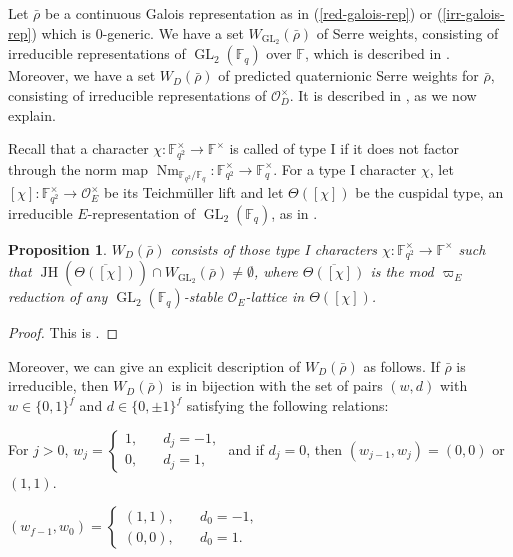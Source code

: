 \documentclass{article}
\newtheorem{proposition}[definition]{Proposition}
\numberwithin{equation}{section}
\DeclareMathOperator{\GL}{GL}
\DeclareMathOperator{\JH}{JH}
\DeclareMathOperator{\Nm}{Nm}
\newcommand{\bF}{\mathbb{F}}
\newcommand{\cO}{\mathcal{O}}
\begin{document}
Let $\bar{\rho}$ be a continuous Galois representation as in (\ref{red-galois-rep}) or (\ref{irr-galois-rep}) which is $0$-generic. 
We have a set $W_{\GL_2}(\bar{\rho})$ of Serre weights, consisting of irreducible representations of $\GL_2(\bF_q)$ over $\bF$, which is described in \cite[\S~11]{BP12}. 
Moreover, we have a set $W_D(\bar{\rho})$ of predicted quaternionic Serre weights for $\bar{\rho}$, consisting of irreducible representations of $\cO_D^\times$. 
It is described in \cite{CW23}, as we now explain. 

Recall that a character $\chi: \bF_{q^2}^\times\to\bF^\times$ is called of type I if it does not factor through the norm map $\Nm_{\bF_{q^2}/\bF_{q}}:\bF_{q^2}^\times\to\bF_{q}^\times$. 
For a type I character $\chi$, 
let $[\chi]: \bF_{q^2}^\times\to \cO_E^\times$ be its Teichm\"uller lift 
and let $\Theta([\chi])$ be the cuspidal type, an irreducible $E$-representation of $\GL_2(\bF_{q})$, as in \cite[\S~1]{Di07}. 

\begin{proposition}
    $W_D(\bar{\rho})$ consists of those type I characters $\chi: \bF_{q^2}^\times\to\bF^\times$ such that 
    $\JH(\overline{\Theta([\chi])})\cap W_{\GL_2}(\bar{\rho})\ne \emptyset$, where $\overline{\Theta([\chi])}$ is the mod $\varpi_{E}$ reduction of any $\GL_2(\bF_q)$-stable $\cO_E$-lattice in $\Theta([\chi])$. 
\end{proposition}

\begin{proof}
    This is \cite[Prop.~2.4]{CW23}.
\end{proof}

Moreover, we can give an explicit description of $W_{D}(\bar{\rho})$ as follows. 
If $\bar{\rho}$ is irreducible, then $W_D(\bar{\rho})$ is in bijection with the set of pairs $(w,d)$ with $w\in \{0,1\}^f$ and $d\in\{0,\pm 1\}^f$ satisfying the following relations: 

\begin{enumerate}[label={[\Roman*]},ref={[\Roman*]}]
    \item\label{RI}
    For $j>0$, $w_j=\begin{cases}
        1, \quad & d_j=-1,\\
        0, \quad & d_j=1,
    \end{cases}$ and if $d_j=0$, then $(w_{j-1},w_j)=(0,0)$ or $(1,1)$.
  
    \item\label{RII}
    $(w_{f-1}, w_{0})=\begin{cases}
        (1,1), \quad & d_0=-1,\\
        (0,0), \quad & d_{0}=1.
    \end{cases}$
  \end{enumerate}
\end{document}
